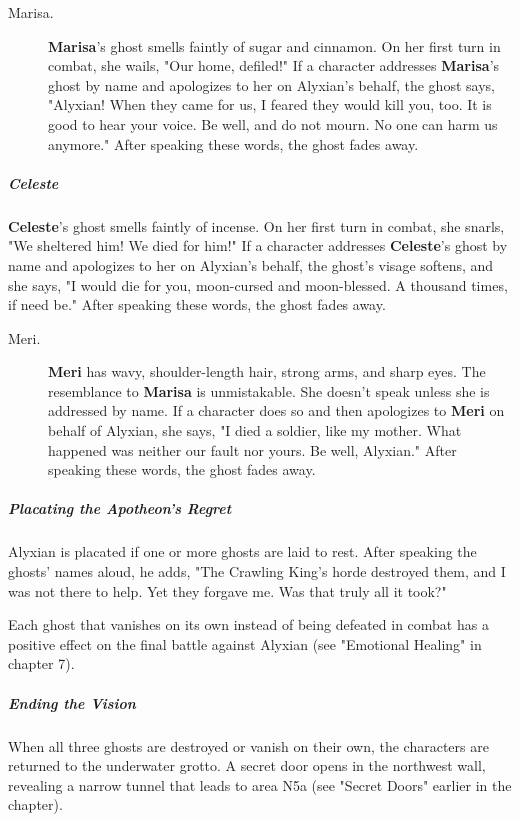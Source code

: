 \documentclass[10pt,a4paper,twoside,bg=print,twocolumn,openany,nodeprecatedcode]{dndbook}
\begin{document}
\begin{description}
\item[Marisa.]
\textbf{Marisa}'s ghost smells faintly of sugar and cinnamon. On her first turn in combat, she wails, "Our home, defiled!" If a character addresses \textbf{Marisa}'s ghost by name and apologizes to her on Alyxian's behalf, the ghost says, "Alyxian! When they came for us, I feared they would kill you, too. It is good to hear your voice. Be well, and do not mourn. No one can harm us anymore." After speaking these words, the ghost fades away.
\end{description}

\subparagraph{Celeste}
\textbf{Celeste}'s ghost smells faintly of incense. On her first turn in combat, she snarls, "We sheltered him! We died for him!" If a character addresses \textbf{Celeste}'s ghost by name and apologizes to her on Alyxian's behalf, the ghost's visage softens, and she says, "I would die for you, moon-cursed and moon-blessed. A thousand times, if need be." After speaking these words, the ghost fades away.


\begin{description}
\item[Meri.]
\textbf{Meri} has wavy, shoulder-length hair, strong arms, and sharp eyes. The resemblance to \textbf{Marisa} is unmistakable. She doesn't speak unless she is addressed by name. If a character does so and then apologizes to \textbf{Meri} on behalf of Alyxian, she says, "I died a soldier, like my mother. What happened was neither our fault nor yours. Be well, Alyxian." After speaking these words, the ghost fades away.
\end{description}

\subparagraph{Placating the Apotheon's Regret}
Alyxian is placated if one or more ghosts are laid to rest. After speaking the ghosts' names aloud, he adds, "The Crawling King's horde destroyed them, and I was not there to help. Yet they forgave me. Was that truly all it took?"

Each ghost that vanishes on its own instead of being defeated in combat has a positive effect on the final battle against Alyxian (see "Emotional Healing" in chapter 7).

\subparagraph{Ending the Vision}
When all three ghosts are destroyed or vanish on their own, the characters are returned to the underwater grotto. A secret door opens in the northwest wall, revealing a narrow tunnel that leads to area N5a (see "Secret Doors" earlier in the chapter).
\end{document}
